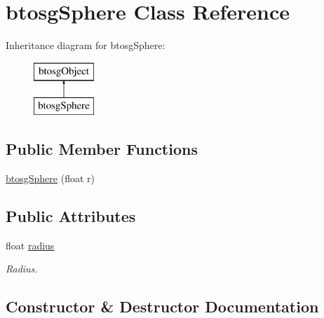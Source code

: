 \hypertarget{classbtosgSphere}{}\section{btosg\+Sphere Class Reference}
\label{classbtosgSphere}
Inheritance diagram for btosg\+Sphere\+:\begin{figure}[H]
\begin{center}
\leavevmode
\includegraphics[height=2.000000cm]{classbtosgSphere}
\end{center}
\end{figure}
\subsection*{Public Member Functions}
\begin{DoxyCompactItemize}
\item 
\hyperlink{classbtosgSphere_a39cc5391405e85edcef16200b52e905c}{btosg\+Sphere} (float r)
\end{DoxyCompactItemize}
\subsection*{Public Attributes}
\begin{DoxyCompactItemize}
\item 
\mbox{\label{classbtosgSphere_afd570c85e9ce1b15b2b4b378e4f6abeb}} 
float \hyperlink{classbtosgSphere_afd570c85e9ce1b15b2b4b378e4f6abeb}{radius}
\begin{DoxyCompactList}\small\item\em Radius. \end{DoxyCompactList}\end{DoxyCompactItemize}


\subsection{Constructor \& Destructor Documentation}
\mbox{\label{classbtosgSphere_a39cc5391405e85edcef16200b52e905c}} 
